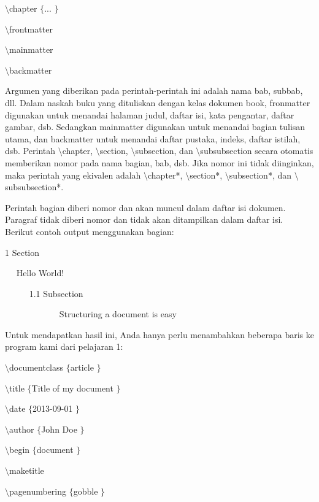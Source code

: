 {\fontsize{10pt}{10pt}\selectfont  $  \setminus  $chapter $  \{  $... $  \}  $}
 \par
\vspace{9pt}
{\fontsize{10pt}{10pt}\selectfont  $  \setminus  $frontmatter}
 \par
\vspace{9pt}
{\fontsize{10pt}{10pt}\selectfont  $  \setminus  $mainmatter}
 \par
\vspace{9pt}
{\fontsize{10pt}{10pt}\selectfont  $  \setminus  $backmatter}
 \par
\vspace{12pt}
\hspace{0.50in} Argumen yang diberikan pada perintah-perintah ini adalah nama bab, subbab, dll. Dalam naskah buku yang dituliskan dengan kelas dokumen book, fronmatter digunakan untuk menandai halaman judul, daftar isi, kata pengantar, daftar gambar, dsb. Sedangkan mainmatter digunakan untuk menandai bagian tulisan utama, dan backmatter untuk menandai daftar pustaka, indeks, daftar istilah, dsb. Perintah  $  \setminus  $chapter,  $  \setminus  $section,  $  \setminus  $subsection, dan  $  \setminus  $subsubsection secara otomatis memberikan nomor pada nama bagian, bab, dsb. Jika nomor ini tidak diinginkan, maka perintah yang ekivalen adalah  $  \setminus  $chapter*,  $  \setminus  $section*,  $  \setminus  $subsection*, dan  $  \setminus  $subsubsection*.
 \par
\vspace{12pt}
\hspace{0.50in} Perintah bagian diberi nomor dan akan muncul dalam daftar isi dokumen. Paragraf tidak diberi nomor dan tidak akan ditampilkan dalam daftar isi. Berikut contoh output menggunakan bagian:
 \par
1 Section
 \par
~~ Hello World!
 \par
~~~~~ 1.1 Subsection
 \par
~~~~~~~~~~~~ Structuring a document is easy
 \par
\vspace{12pt}
\hspace{0.50in} Untuk mendapatkan hasil ini, Anda hanya perlu menambahkan beberapa baris ke program kami dari pelajaran 1:
 \par
 $  \setminus  $documentclass $  \{  $article $  \}  $
 \par
\vspace{12pt}
 $  \setminus  $title $  \{  $Title of my document $  \}  $
 \par
 $  \setminus  $date $  \{  $2013-09-01 $  \}  $
 \par
 $  \setminus  $author $  \{  $John Doe $  \}  $
 \par
\vspace{12pt}
 $  \setminus  $begin $  \{  $document $  \}  $
 \par
\vspace{12pt}
 $  \setminus  $maketitle
 \par
 $  \setminus  $pagenumbering $  \{  $gobble $  \}  $
 \par

